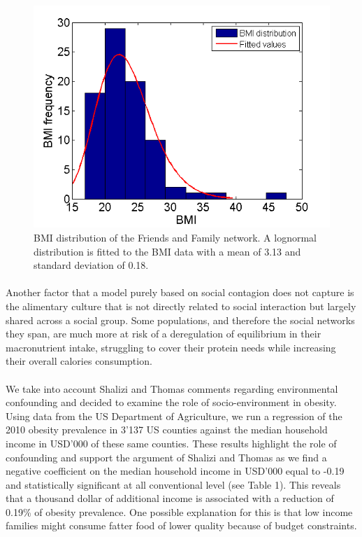 \documentclass[11pt]{article}
\begin{document}
\begin{figure}[!h]
\center
   \includegraphics[scale = 0.9]{bmi_distribution_figure4.png}
   \caption{\label{4} BMI distribution of the Friends and Family network. A lognormal distribution is fitted to the BMI data with a mean of 3.13 and standard deviation of 0.18.}
\end{figure}

\paragraph{}

Another factor that a model purely based on social contagion does not capture is the alimentary culture that is not directly related to social interaction but largely shared across a social group. Some populations, and therefore the social networks they span, are much more at risk of a deregulation of equilibrium in their macronutrient intake, struggling to cover their protein needs while increasing their overall calories consumption. 

\paragraph{}
We take into account Shalizi and Thomas comments regarding environmental confounding and decided to examine the role of socio-environment in obesity. Using data from the US Department of Agriculture, we run a regression of the 2010 obesity prevalence in 3'137 US counties against the median household income in USD'000 of these same counties. These results highlight the role of confounding and support the argument of Shalizi and Thomas as we find a negative coefficient on the median household income in USD'000 equal to -0.19 and statistically significant at all conventional level (see Table 1). This reveals that a thousand dollar of additional income is associated with a reduction of 0.19\% of obesity prevalence. One possible explanation for this is that low income families might consume fatter food of lower quality because of budget constraints.
\end{document}
